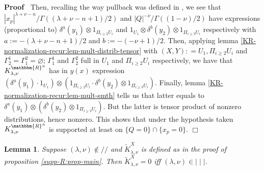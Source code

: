 \documentclass{article}
\newcommand{\assign}{:=}
\newcommand{\nin}{\not\in}
\renewenvironment{proof}{\noindent\textbf{Proof\ }}{\hspace*{\fill}$\Box$\medskip}
\newtheorem{lemma}[proposition]{Lemma}
\theoremstyle{remark}
\begin{document}
\begin{proof}
  Then, recalling the way pullback was defined in
  {\cite{hormander1983analysis}}, we see that $| x_p |^{\lambda + \nu - n} /
  \Gamma ((\lambda + \nu - n + 1) / 2)$ and $| Q |^{- \nu} / \Gamma ((1 - \nu)
  / 2)$ have expressions (proportional to) $\delta^a (y_1) \otimes 1_{\Pi_{i
  \geqslant 2} U_i}$ and $1_{U_1} \otimes \delta^b (y_2) \otimes 1_{\Pi_{i
  \geqslant 3} U_i}$ respectively with $a \assign - (\lambda + \nu - n + 1) /
  2$ and $b \assign - (- \nu + 1) / 2$. Then, applying lemma
  \ref{KR-normalization-recur:lem-mult-distrib-tensor} with $(X, Y) : = U_1,
  \Pi_{i \geqslant 2} U_i$ and $\Gamma_2^1 = \Gamma_1^2 = \varnothing$;
  $\Gamma^1_1$ and $\Gamma_2^2$ full in $U_1$ and $\Pi_{i \geqslant 2} U_i$
  respectively, we have that $K_{\lambda, \nu}^{\mathbbm{R}^n}$ has in $y (x)$
  expression $(\delta^a (y_1) \cdot 1_{U_1}) \otimes (1_{\Pi_{i \geqslant 2}
  U_i} \cdot \delta^b (y_2) \otimes 1_{\Pi_{i \geqslant 3} U_i})$. Finally,
  lemma \ref{KR-normalization-recur:lem-mult-smth} tells us that latter equals
  to $\delta^a (y_1) \otimes (\delta^b (y_2) \otimes 1_{\Pi_{i \geqslant 3}
  U_i})$. But the latter is tensor product of nonzero distributions, hence
  nonzero. This shows that under the hypothesis taken $K_{\lambda,
  \nu}^{\mathbbm{R}^n}$ is supported at least on $\{ Q = 0 \} \cap \{ x_p = 0
  \}$.
\end{proof}

\begin{lemma}
  \label{supp-R:lem-Kzero}Suppose $(\lambda, \nu) \nin / /$ and
  $\tilde{K}_{\lambda, \nu}^X$ is defined as in the proof of proposition
  \ref{supp-R:prop-main}. Then $\tilde{K}_{\lambda, \nu}^X = 0$ iff $(\lambda,
  \nu) \in \mid \mid \mid$.
\end{lemma}
\end{document}
